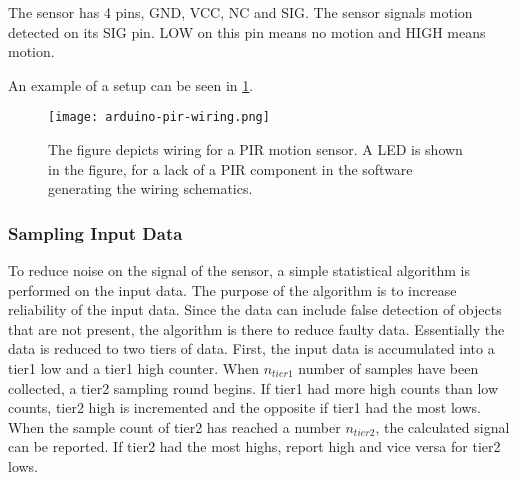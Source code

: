 The sensor has 4 pins, GND, VCC, NC and SIG. The sensor signals motion detected on its SIG pin. LOW on this pin means no motion and HIGH means motion.

An example of a setup can be seen in \cref{fig:arduino_pir_wiring}.

\begin{figure}[htbp]
  \centering
  \texttt{[image: arduino-pir-wiring.png]}
  \caption{The figure depicts wiring for a PIR motion sensor. A LED is shown in
    the figure, for a lack of a PIR component in the software generating the
    wiring schematics.}
  \label{fig:arduino_pir_wiring}
\end{figure}

\subsubsection{Sampling Input Data}

To reduce noise on the signal of the sensor, a simple statistical algorithm is
performed on the input data. The purpose of the algorithm is to increase reliability of the input data. Since the data can include false detection of objects that are not present, the algorithm is there to reduce  faulty data.  Essentially the data is reduced to two tiers
of data. First, the input data is accumulated into a tier1 low and a tier1 high
counter. When $n_{tier1}$ number of samples have been collected, a tier2 sampling round begins. If tier1
had more high counts than low counts, tier2 high is incremented and the opposite if
tier1 had the most lows. When the sample count of tier2 has reached a number
$n_{tier2}$, the calculated signal can be reported. If tier2 had the most highs,
report high and vice versa for tier2 lows.



